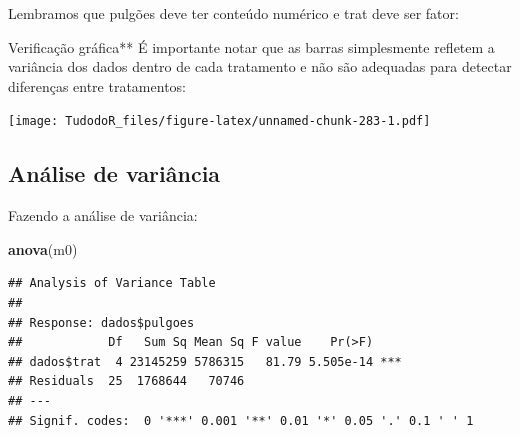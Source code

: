 \documentclass[
]{book}
\newenvironment{Shaded}{\begin{snugshade}}{\end{snugshade}}
\newcommand{\KeywordTok}[1]{\textcolor[rgb]{0.13,0.29,0.53}{\textbf{#1}}}
\newcommand{\NormalTok}[1]{#1}
\newcommand{\OperatorTok}[1]{\textcolor[rgb]{0.81,0.36,0.00}{\textbf{#1}}}
\newcommand{\StringTok}[1]{\textcolor[rgb]{0.31,0.60,0.02}{#1}}
\begin{document}
Lembramos que pulgões deve ter conteúdo numérico e trat deve ser fator:

\begin{Shaded}
\end{Shaded}

Verificação gráfica**
É importante notar que as barras simplesmente refletem a variância dos dados dentro de cada tratamento e não são adequadas para detectar diferenças entre tratamentos:

\begin{Shaded}
\end{Shaded}

\texttt{[image: TudodoR\_files/figure-latex/unnamed-chunk-283-1.pdf]}

\hypertarget{anuxe1lise-de-variuxe2ncia}{%
\subsection{Análise de variância}\label{anuxe1lise-de-variuxe2ncia}}

Fazendo a análise de variância:

\begin{Shaded}
\end{Shaded}

\begin{Shaded}
\begin{Highlighting}[]
\KeywordTok{anova}\NormalTok{(m0)}
\end{Highlighting}
\end{Shaded}

\begin{verbatim}
## Analysis of Variance Table
## 
## Response: dados$pulgoes
##            Df   Sum Sq Mean Sq F value    Pr(>F)    
## dados$trat  4 23145259 5786315   81.79 5.505e-14 ***
## Residuals  25  1768644   70746                      
## ---
## Signif. codes:  0 '***' 0.001 '**' 0.01 '*' 0.05 '.' 0.1 ' ' 1
\end{verbatim}
\end{document}
